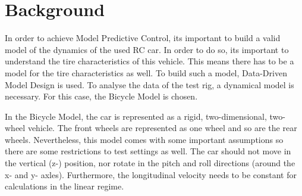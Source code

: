 \section{Background}
In order to achieve Model Predictive Control, it\textquotesingle s important to build a valid model of the dynamics of the used RC car. In order to do so, it\textquotesingle s important to understand the tire characteristics of this vehicle. This means there has to be a model for the tire characteristics as well. To build such a model, Data-Driven Model Design is used. 
To analyse the data of the test rig, a dynamical model is necessary. For this case, the Bicycle Model is chosen. 

In the Bicycle Model, the car is represented as a rigid, two-dimensional, two-wheel vehicle. The front wheels are represented as one wheel and so are the rear wheels. Nevertheless, this model comes with some important assumptions so there are some restrictions to test settings as well. The car should not move in the vertical (z-) position, nor rotate in the pitch and roll directions (around the x- and y- axles). Furthermore, the longitudinal velocity needs to be constant for calculations in the linear regime.
